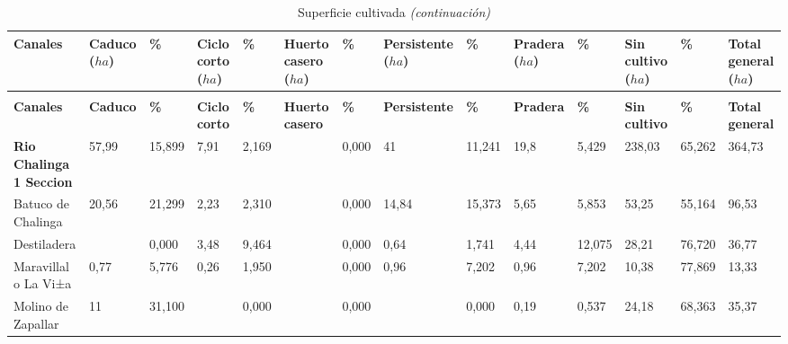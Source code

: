 \documentclass[]{article}
\begin{document}
\begin{landscape}
	\begin{longtable}{|p{2.5cm}|p{1.5cm}|p{1cm}|p{1cm}|p{1cm}|p{1cm}|p{1cm}|p{1.7cm}|p{1cm}|p{1.5cm}|p{1cm}|p{1cm}|p{1cm}|p{1.5cm}|}
	\caption{Superficie cultiva}
	\hline	
	\textbf{Canales}  & \textbf{Caduco} ($ha$) & \textbf{\%} & \textbf{Ciclo corto} ($ha$) & \textbf{\%} & \textbf{Huerto casero} ($ha$) & \textbf{\%} & \textbf{Persistente} ($ha$) & \textbf{\%} & \textbf{Pradera} ($ha$) & \textbf{\%} & \textbf{Sin cultivo} ($ha$) & \textbf{\%} & \textbf{Total general} ($ha$) \\ 
	\hline
	\endfirsthead
	\caption{Superficie cultivada \emph{(continuación)}}\\
	\hline	
	\textbf{Canales}  & \textbf{Caduco} & \textbf{\%} & \textbf{Ciclo corto} & \textbf{\%} & \textbf{Huerto casero} & \textbf{\%} & \textbf{Persistente} & \textbf{\%} & \textbf{Pradera} & \textbf{\%} & \textbf{Sin cultivo} & \textbf{\%} & \textbf{Total general} \\ 
	\hline
	\endhead
	\hline
	\endfoot
	\endlastfood 
	\textbf{Rio Chalinga 1 Seccion}  & 57,99           & 15,899      & 7,91                 & 2,169       &                        & 0,000       & 41                   & 11,241      & 19,8             & 5,429       & 238,03               & 65,262      & 364,73                 \\ \hline 
	\hline
	Batuco de Chalinga               & 20,56           & 21,299      & 2,23                 & 2,310       &                        & 0,000       & 14,84                & 15,373      & 5,65             & 5,853       & 53,25                & 55,164      & 96,53                  \\ \hline
	Destiladera                      &                 & 0,000       & 3,48                 & 9,464       &                        & 0,000       & 0,64                 & 1,741       & 4,44             & 12,075      & 28,21                & 76,720      & 36,77                  \\ \hline
	Maravillal o La Vi±a             & 0,77            & 5,776       & 0,26                 & 1,950       &                        & 0,000       & 0,96                 & 7,202       & 0,96             & 7,202       & 10,38                & 77,869      & 13,33                  \\ \hline
	Molino de Zapallar               & 11              & 31,100      &                      & 0,000       &                        & 0,000       &                      & 0,000       & 0,19             & 0,537       & 24,18                & 68,363      & 35,37                  \\ \hline

\end{longtable}
\end{landscape}
\end{document}

